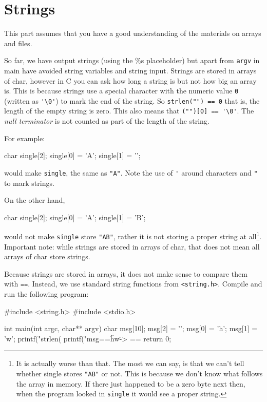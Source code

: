 
\chapter{Strings}

\begin{knowledge}
This part assumes that you have a good understanding of the materials on arrays and files. 
\end{knowledge}

So far, we have output strings (using the \%s placeholder) but apart from \texttt{argv} in main have avoided string variables and string input.
Strings are stored in arrays of char, however in C you can ask how long a string is but not how big an array is.
This is because strings use a special character with the numeric value \texttt{0} (written as \lstinline!'\0'!) to mark the end of the string.
So \lstinline!strlen("") == 0! that is, the length of the empty string is zero.
This also means that \lstinline!("")[0] == '\0'!.
The \emph{null terminator} is not counted as part of the length of the string.


For example:

\begin{codeblock}
char single[2];
single[0] = 'A';
single[1] = '\0';
\end{codeblock}

would make \texttt{single}, the same as \verb!"A"!.
Note the use of \lstinline!'! around characters and \lstinline!"! to mark strings.

On the other hand,
\begin{codeblock}
char single[2];
single[0] = 'A';
single[1] = 'B';
\end{codeblock}
would not make \texttt{single} store \verb!"AB"!, rather it is not storing a proper string at all\footnote{It is actually worse than that.
The most we can say, is that we can't tell whether single stores \texttt{"AB"} or not.
This is because we don't know what follows the array in memory.
If there just happened to be a zero byte next then, when the program looked in \texttt{single} it would see a proper string.
}.
Important note: while strings are stored in arrays of char, that does not mean all arrays of char store strings.

Because strings are stored in arrays, it does not make sense to compare them with \texttt{==}.
Instead, we use standard string functions from \lstinline{<string.h>}.
Compile and run the following program:
\begin{codeblock}
#include <string.h>
#include <stdio.h>

int main(int argc, char** argv) {
    char msg[10];	
    msg[2] = '\0';
    msg[0] = 'h';
    msg[1] = 'w';
    printf("strlen(%
    printf("msg==\"hw\" -> %
        ==%
    return 0;
}
\end{codeblock}

